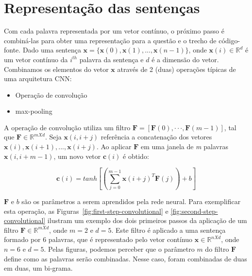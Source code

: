 \section{Representação das sentenças}
\label{sec:representacao-sentenca}

Com cada palavra representada por um vetor contínuo, o próximo passo é combiná-las para obter uma representação para a questão e o trecho de código-fonte. Dado uma sentença $\bm{x} = \{ \bm{x}(0), \bm{x}(1), . . ., \bm{x}(n - 1) \}$, onde $\bm{x}(i) \in \mathbb{R}^{d}$ é um vetor contínuo da $i^{th}$ palavra da sentença e $d$ é a dimensão do vetor. Combinamos os elementos do vetor $\bm{x}$ através de 2 (duas) operações típicas de uma arquitetura CNN:

\begin{itemize}
    \item Operação de convolução
    \item \Gls{max-pooling}
\end{itemize}

A operação de convolução utiliza um filtro $\bm{F}  = [\bm{F}(0),· · ·, \bm{F}(m - 1)]$, tal que $\bm{F} \in \mathbb{R}^{m X d}$. Seja $\bm{x}(i, i + j)$ referência a concatenação dos vetores $\bm{x}(i), \bm{x}(i + 1), . . ., \bm{x}(i + j)$. Ao aplicar $\bm{F}$ em uma janela de \emph{m} palavras $\bm{x}(i, i + m - 1)$, um novo vetor $\bm{c}(i)$ é obtido:

\begin{equation}\label{eq:calc_convolution_ci}
    \bm{c}(i) = tanh \left[\left(\sum_{j=0}^{m - 1} \bm{x}(i + j)^{T}\bm{F}(j)\right) + b\right]
\end{equation}

$\bm{F}$ e $b$ são os parâmetros a serem aprendidos pela rede neural. Para exemplificar esta operação, as Figuras~\ref{fig:first-step-convolutional} e \ref{fig:second-step-convolutional} ilustram um exemplo dos dois primeiros passos da aplicação de um filtro $\bm{F} \in \mathbb{R}^{m X d}$, onde $m = 2$ e $d = 5$. Este filtro é aplicado a uma sentença formado por 6 palavras, que é representado pelo vetor contínuo $\bm{x} \in \mathbb{R}^{n X d}$, onde $n = 6$ e $d = 5$. Pelas figuras, podemos perceber que o parâmetro $m$ do filtro $\bm{F}$ define como as palavras serão combinadas. Nesse caso, foram combinadas de duas em duas, um bi-grama.

